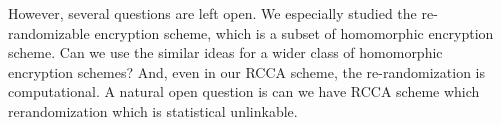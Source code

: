However, several questions are left open. 
We especially studied the re-randomizable encryption scheme, which is a subset of homomorphic encryption scheme.
Can we use the similar ideas for a wider class of homomorphic encryption schemes?
And, even in our RCCA scheme, the re-randomization is computational.
A natural open question is can we have RCCA scheme which rerandomization which is statistical unlinkable.

